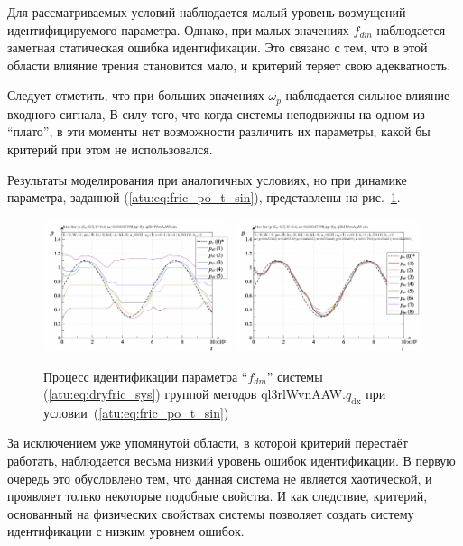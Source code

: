 Для рассматриваемых условий наблюдается малый уровень возмущений
идентифицируемого параметра. Однако, при малых значениях $f_{dm}$
наблюдается заметная статическая ошибка идентификации. Это связано с тем,
что в этой области влияние трения становится мало,
и критерий теряет свою адекватность.

Следует отметить, что при
больших значениях $\omega_p$ наблюдается
сильное влияние входного сигнала, В силу того, что когда системы неподвижны
на одном из ``плато'', в эти моменты нет возможности различить их параметры,
какой бы критерий при этом не использовался.

Результаты моделирования при аналогичных условиях, но
при динамике параметра, заданной (\ref{atu:eq:fric_po_t_sin}),
представлены на рис.~\ref{atu:f:fric_id_ql3rlWvnAAW_q_dx_sin}.

\begin{figure}[htb!]
  \centerline{
    \includegraphics[width=0.49\textwidth]{p/cha/fric/ql3rlWvnAAW/fric_id-p_t_pi_ql3rlWvnAAW_sin.png}
    \hfill
    \includegraphics[width=0.49\textwidth]{p/cha/fric/ql3rlWvnAAW/fric_id-p_t_p_ql3rlWvnAAW_sin.png}
  }
  \caption{Процесс идентификации параметра ``$f_{dm}$'' системы (\ref{atu:eq:dryfric_sys}) группой методов ql3rlWvnAAW.$q_\mathrm{dx}$ при условии~(\ref{atu:eq:fric_po_t_sin})}
  \label{atu:f:fric_id_ql3rlWvnAAW_q_dx_sin}
\end{figure}

За исключением уже упомянутой области, в которой критерий перестаёт работать,
наблюдается весьма низкий уровень ошибок идентификации.
В первую очередь это обусловлено тем, что данная система не является
хаотической, и проявляет только некоторые подобные свойства.
И как следствие, критерий, основанный на физических свойствах системы
позволяет создать систему идентификации с низким уровнем ошибок.


